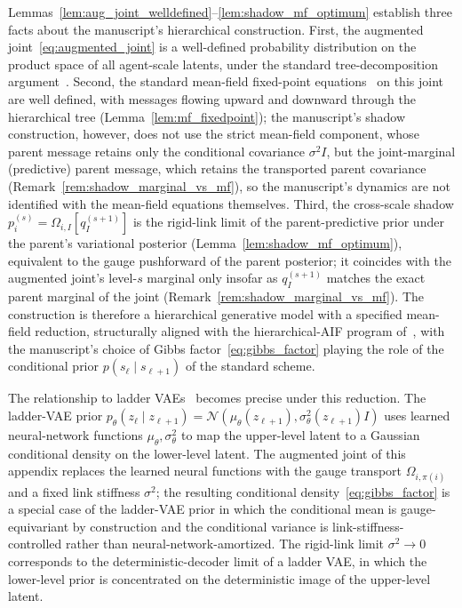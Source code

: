 \documentclass[11pt]{article}
\begin{document}
Lemmas~\ref{lem:aug_joint_welldefined}--\ref{lem:shadow_mf_optimum} establish three facts about the manuscript's hierarchical construction. First, the augmented joint~\eqref{eq:augmented_joint} is a well-defined probability distribution on the product space of all agent-scale latents, under the standard tree-decomposition argument~\cite[\S3.2]{Lauritzen1996}. Second, the standard mean-field fixed-point equations~\cite[Prop.~4.1]{Wainwright2008} on this joint are well defined, with messages flowing upward and downward through the hierarchical tree (Lemma~\ref{lem:mf_fixedpoint}); the manuscript's shadow construction, however, does not use the strict mean-field component, whose parent message retains only the conditional covariance $\sigma^2 I$, but the joint-marginal (predictive) parent message, which retains the transported parent covariance (Remark~\ref{rem:shadow_marginal_vs_mf}), so the manuscript's dynamics are not identified with the mean-field equations themselves. Third, the cross-scale shadow $p_i^{(s)} = \Omega_{i,I}[q_I^{(s+1)}]$ is the rigid-link limit of the parent-predictive prior under the parent's variational posterior (Lemma~\ref{lem:shadow_mf_optimum}), equivalent to the gauge pushforward of the parent posterior; it coincides with the augmented joint's level-$s$ marginal only insofar as $q_I^{(s+1)}$ matches the exact parent marginal of the joint (Remark~\ref{rem:shadow_marginal_vs_mf}). The construction is therefore a hierarchical generative model with a specified mean-field reduction, structurally aligned with the hierarchical-AIF program of~\cite{Friston2017, parr2022active}, with the manuscript's choice of Gibbs factor~\eqref{eq:gibbs_factor} playing the role of the conditional prior $p(s_\ell \mid s_{\ell+1})$ of the standard scheme.

The relationship to ladder VAEs~\cite{Sonderby2016} becomes precise under this reduction. The ladder-VAE prior $p_\theta(z_\ell \mid z_{\ell+1}) = \mathcal{N}(\mu_\theta(z_{\ell+1}), \sigma^2_\theta(z_{\ell+1}) I)$ uses learned neural-network functions $\mu_\theta, \sigma^2_\theta$ to map the upper-level latent to a Gaussian conditional density on the lower-level latent. The augmented joint of this appendix replaces the learned neural functions with the gauge transport $\Omega_{i,\pi(i)}$ and a fixed link stiffness $\sigma^2$; the resulting conditional density~\eqref{eq:gibbs_factor} is a special case of the ladder-VAE prior in which the conditional mean is gauge-equivariant by construction and the conditional variance is link-stiffness-controlled rather than neural-network-amortized. The rigid-link limit $\sigma^2 \to 0$ corresponds to the deterministic-decoder limit of a ladder VAE, in which the lower-level prior is concentrated on the deterministic image of the upper-level latent.
\end{document}

